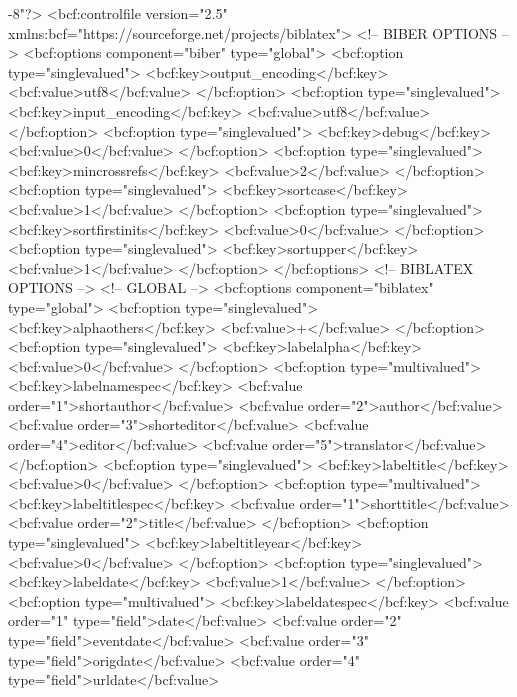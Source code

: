 \relax 
{}
-8"?>
<bcf:controlfile version="2.5" xmlns:bcf="https://sourceforge.net/projects/biblatex">
  <!-- BIBER OPTIONS -->
  <bcf:options component="biber" type="global">
    <bcf:option type="singlevalued">
      <bcf:key>output_encoding</bcf:key>
      <bcf:value>utf8</bcf:value>
    </bcf:option>
    <bcf:option type="singlevalued">
      <bcf:key>input_encoding</bcf:key>
      <bcf:value>utf8</bcf:value>
    </bcf:option>
    <bcf:option type="singlevalued">
      <bcf:key>debug</bcf:key>
      <bcf:value>0</bcf:value>
    </bcf:option>
    <bcf:option type="singlevalued">
      <bcf:key>mincrossrefs</bcf:key>
      <bcf:value>2</bcf:value>
    </bcf:option>
    <bcf:option type="singlevalued">
      <bcf:key>sortcase</bcf:key>
      <bcf:value>1</bcf:value>
    </bcf:option>
    <bcf:option type="singlevalued">
      <bcf:key>sortfirstinits</bcf:key>
      <bcf:value>0</bcf:value>
    </bcf:option>
    <bcf:option type="singlevalued">
      <bcf:key>sortupper</bcf:key>
      <bcf:value>1</bcf:value>
    </bcf:option>
  </bcf:options>
  <!-- BIBLATEX OPTIONS -->
  <!-- GLOBAL -->
  <bcf:options component="biblatex" type="global">
    <bcf:option type="singlevalued">
      <bcf:key>alphaothers</bcf:key>
      <bcf:value>+</bcf:value>
    </bcf:option>
    <bcf:option type="singlevalued">
      <bcf:key>labelalpha</bcf:key>
      <bcf:value>0</bcf:value>
    </bcf:option>
    <bcf:option type="multivalued">
      <bcf:key>labelnamespec</bcf:key>
      <bcf:value order="1">shortauthor</bcf:value>
      <bcf:value order="2">author</bcf:value>
      <bcf:value order="3">shorteditor</bcf:value>
      <bcf:value order="4">editor</bcf:value>
      <bcf:value order="5">translator</bcf:value>
    </bcf:option>
    <bcf:option type="singlevalued">
      <bcf:key>labeltitle</bcf:key>
      <bcf:value>0</bcf:value>
    </bcf:option>
    <bcf:option type="multivalued">
      <bcf:key>labeltitlespec</bcf:key>
      <bcf:value order="1">shorttitle</bcf:value>
      <bcf:value order="2">title</bcf:value>
    </bcf:option>
    <bcf:option type="singlevalued">
      <bcf:key>labeltitleyear</bcf:key>
      <bcf:value>0</bcf:value>
    </bcf:option>
    <bcf:option type="singlevalued">
      <bcf:key>labeldate</bcf:key>
      <bcf:value>1</bcf:value>
    </bcf:option>
    <bcf:option type="multivalued">
      <bcf:key>labeldatespec</bcf:key>
      <bcf:value order="1" type="field">date</bcf:value>
      <bcf:value order="2" type="field">eventdate</bcf:value>
      <bcf:value order="3" type="field">origdate</bcf:value>
      <bcf:value order="4" type="field">urldate</bcf:value>
